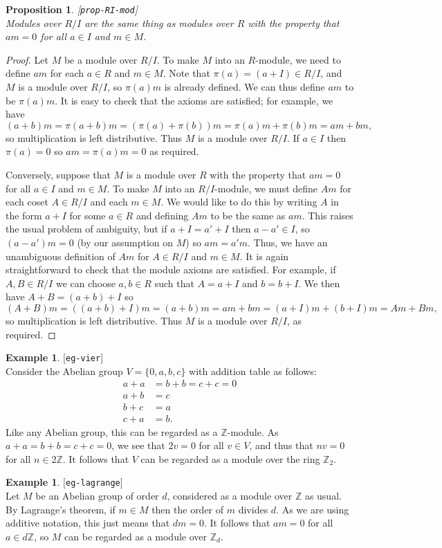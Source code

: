\documentclass{amsart}
\newcommand{\lbl}[1]{\label{#1}\textup{[\texttt{#1}]}\ \\}
\newcommand{\lbl}{\label}
\newcommand{\Z}         {{\mathbb{Z}}}
\renewcommand{\:}{\colon}
\newtheorem{proposition}[theorem]{Proposition}
\theoremstyle{definition}
\newtheorem{example}[theorem]{Example}
\begin{document}
\begin{proposition}\lbl{prop-RI-mod}
 Modules over $R/I$ are the same thing as modules over $R$ with the
 property that $am=0$ for all $a\in I$ and $m\in M$. 
\end{proposition}
\begin{proof}
 Let $M$ be a module over $R/I$.  To make $M$ into an $R$-module, we
 need to define $am$ for each $a\in R$ and $m\in M$.  Note that
 $\pi(a)=(a+I)\in R/I$, and $M$ is a module over $R/I$, so $\pi(a)m$
 is already defined.  We can thus define $am$ to be $\pi(a)m$.  It is
 easy to check that the axioms are satisfied; for example, we have
 \[ (a+b)m=\pi(a+b)m=(\pi(a)+\pi(b))m=\pi(a)m + \pi(b)m = am+bm, \]
 so multiplication is left distributive.  Thus $M$ is a module over
 $R/I$.  If $a\in I$ then $\pi(a)=0$ so $am=\pi(a)m=0$ as required.

 Conversely, suppose that $M$ is a module over $R$ with the property
 that $am=0$ for all $a\in I$ and $m\in M$.  To make $M$ into an
 $R/I$-module, we must define $Am$ for each coset $A\in R/I$ and each
 $m\in M$.  We would like to do this by writing $A$ in the form $a+I$
 for some $a\in R$ and defining $Am$ to be the same as $am$.  This
 raises the usual problem of ambiguity, but if $a+I=a'+I$ then
 $a-a'\in I$, so $(a-a')m=0$ (by our assumption on $M$) so $am=a'm$.
 Thus, we have an unambiguous definition of $Am$ for $A\in R/I$ and
 $m\in M$.  It is again straightforward to check that the module
 axioms are satisfied.  For example, if $A,B\in R/I$ we can choose
 $a,b\in R$ such that $A=a+I$ and $b=b+I$.  We then have $A+B=(a+b)+I$
 so 
 \[ (A+B)m=((a+b)+I)m=(a+b)m=am+bm=(a+I)m+(b+I)m=Am+Bm, \]
 so multiplication is left distributive.  Thus $M$ is a module over
 $R/I$, as required.
\end{proof}
\begin{example}\lbl{eg-vier}
 Consider the Abelian group $V=\{0,a,b,c\}$ with addition table as
 follows:
 \begin{align*}
  a+a &= b+b = c+c = 0 \\
  a+b &= c \\
  b+c &= a \\
  c+a &= b.
 \end{align*}
 Like any Abelian group, this can be regarded as a $\Z$-module.  As
 $a+a=b+b=c+c=0$, we see that $2v=0$ for all $v\in V$, and thus that
 $nv=0$ for all $n\in 2\Z$.  It follows that $V$ can be regarded as a
 module over the ring $\Z_2$.
\end{example}
\begin{example}\lbl{eg-lagrange}
 Let $M$ be an Abelian group of order $d$, considered as a module over
 $\Z$ as usual.  By Lagrange's theorem, if $m\in M$ then the order of
 $m$ divides $d$.  As we are using additive notation, this just means
 that $dm=0$.  It follows that $am=0$ for all $a\in d\Z$, so $M$ can
 be regarded as a module over $\Z_d$.
\end{example}
\end{document}
